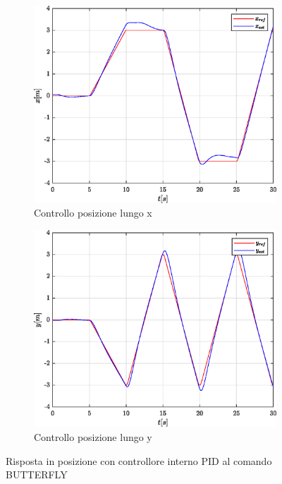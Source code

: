 \begin{figure}
	\centering
	\begin{subfigure}{0.45\textwidth}
		\centering
		\includegraphics[width=1\textwidth]{Simulazioni/Figure/PID/BUTTERFLY/PositionControlXPos}
		\caption{Controllo posizione lungo x}
		\label{fig:BUTTERFLYerrposxPID}
	\end{subfigure}
	\hfill
	\begin{subfigure}{0.45\textwidth}
		\centering
		\includegraphics[width=1\textwidth]{Simulazioni/Figure/PID/BUTTERFLY/PositionControlYPos}
		\caption{Controllo posizione lungo y}
		\label{fig:BUTTERFLYerrposyPID}
	\end{subfigure}
	\caption{Risposta in posizione con controllore interno PID al comando BUTTERFLY}
\end{figure}

